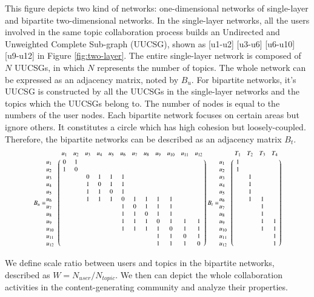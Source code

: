 \documentclass{elsarticle}
\begin{document}
This figure depicts  two kind of  networks: one-dimensional networks of
single-layer and bipartite two-dimensional networks. 
In the single-layer networks, all the users involved in the same topic
collaboration process builds an Undirected and Unweighted Complete
Sub-graph (UUCSG), shown as [u1-u2] [u3-u6] [u6-u10] [u9-u12] in
Figure \ref{fig:two-layer}. The entire single-layer network is composed of $N$ UUCSGs, in
which $N$ represents the number of topics. The whole network can be
expressed as an adjacency matrix, noted by $B_u$.
For bipartite networks, it's UUCSG is constructed by all the UUCSGs in
 the single-layer networks and the topics which the UUCSGs belong
 to. The number of nodes is equal to the numbers of the user
 nodes. Each bipartite network focuses on  certain areas but ignore
 others. It  constitutes a circle which has high
 cohesion but loosely-coupled. Therefore, the bipartite networks can be described as an
 adjacency matrix $B_t$. 
\begin{displaymath}
\scalebox{0.73}{
$
  B_u = \bordermatrix{%
    &u_1&u_2&u_3&u_4&u_5&u_6&u_7&u_8&u_9&u_{10}&u_{11}&u_{12} \cr
  u_1&0&1 \cr
  u_2&1&0 \cr
  u_3&&&0&1&1&1 \cr
   u_4&&&1&0&1&1 \cr
 u_5&&&1&1&0&1 \cr
 u_6&&&1&1&1&0&1&1&1&1 \cr
 u_7&&&&&&1&0&1&1&1 \cr
 u_8&&&&&&1&1&0&1&1 \cr
u_9&&&&&&1&1&1&0&1&1&1 \cr
  u_{10}&&&&&&1&1&1&1&0&1&1 \cr
   u_{11}&&&&&&&&&1&1&0&1 \cr
  u_{12}&&&&&&&&&1&1&1&0 \cr
}
$

$
   B_t = \bordermatrix{%
    &T_1&T_2&T_3&T_4 \cr
   u_1&1 \cr
   u_2&1 \cr
    u_3&&1 \cr
    u_4&&1 \cr
    u_5&&1 \cr
    u_6&&1&1 \cr
    u_7&&&1 \cr
    u_8&&&1 \cr
    u_9&&&1&1 \cr
    u_{10}&&&1&1 \cr
    u_{11}&&&&1 \cr
    u_{12}&&&&1 \cr
}
$
}
\end{displaymath}

We define scale ratio  between users and topics  in
 the bipartite networks,
 described as
 \begin{math}
 W = N_{user}/N_{topic}   
 \end{math}.
We then can depict the whole collaboration activities in the
content-generating community and analyze their properties.
\end{document}
